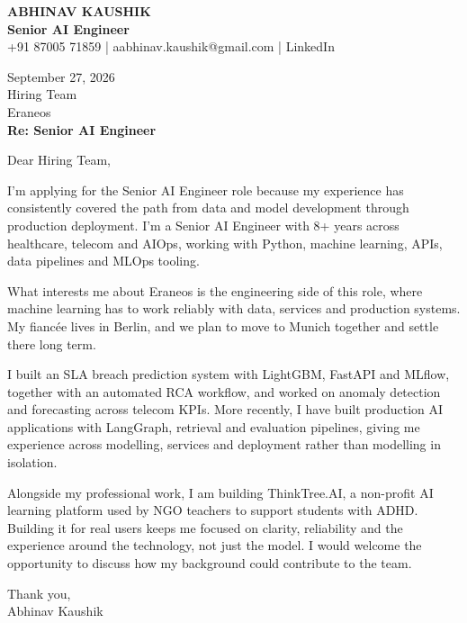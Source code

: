 \documentclass[10pt,a4paper]{article}
\begin{document}
\begin{center}
{\Large\bfseries ABHINAV KAUSHIK}\\[2pt]
{\bfseries Senior AI Engineer}\\[2pt]
+91 87005 71859 \quad | \quad aabhinav.kaushik@gmail.com \quad | \quad LinkedIn
\end{center}
\vspace{8pt}
September 27, 2026\\[6pt]
Hiring Team\\
Eraneos\\[4pt]
\textbf{Re: Senior AI Engineer}

Dear Hiring Team,

I’m applying for the Senior AI Engineer role because my experience has consistently covered the path from data and model development through production deployment. I’m a Senior AI Engineer with 8+ years across healthcare, telecom and AIOps, working with Python, machine learning, APIs, data pipelines and MLOps tooling.

What interests me about Eraneos is the engineering side of this role, where machine learning has to work reliably with data, services and production systems. My fiancée lives in Berlin, and we plan to move to Munich together and settle there long term.

I built an SLA breach prediction system with LightGBM, FastAPI and MLflow, together with an automated RCA workflow, and worked on anomaly detection and forecasting across telecom KPIs. More recently, I have built production AI applications with LangGraph, retrieval and evaluation pipelines, giving me experience across modelling, services and deployment rather than modelling in isolation.

Alongside my professional work, I am building ThinkTree.AI, a non-profit AI learning platform used by NGO teachers to support students with ADHD. Building it for real users keeps me focused on clarity, reliability and the experience around the technology, not just the model. I would welcome the opportunity to discuss how my background could contribute to the team.

Thank you,\\
Abhinav Kaushik
\end{document}
